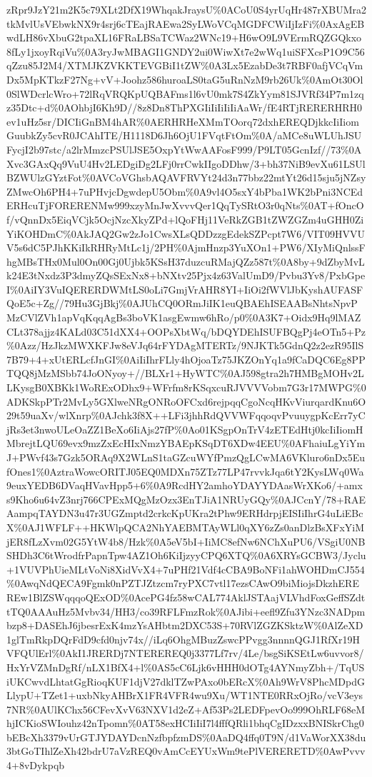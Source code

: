 \documentclass[]{article}
\begin{document}
zRpr9JzY21m2K5c79XLt2DfX19WhqakJraysU\%0ACoU0S4yrUqHr487rXBUMra2tkMvlUsVEbwkNX9r4srj6cTEajRAEwa2SyLWoVCqMGDFCWiIjIzFi\%0AxAgEBwdLH86vXbuG2tpaXL16FRaLBSaTCWaz2WNc19+H6wO9L9VErmRQZGQkxo8fLy1jxoyRqiVu\%0A3ryJwMBAGI1GNDY2ui0WiwXt7e2wWq1uiSFXcsP1O9C56qZzu85J2M4/XTMJKZVKKTEVGBiI1tZW\%0A3Lx5EzabDe3t7RBF0afjVCqVmDx5MpKTkzF27Ng+vV+Joohz586huroaLS0taG5uRnNzM9rb26Uk\%0AmOt30Ol0SlWDcrlcWro+72lRqVRQKpUQBAFms1l6vU0mk7S4ZkYym81SJVRf34P7m1zqz35Dtc+d\%0AOhbjI6Kh9D//8z8Dn8ThPXGIiIiIiIiIiAaWr/fE4RTjRERERHRH0ev1uHz5sr/DICIiGnBM4hAR\%0AERHRHeXMmTOorq72dxhEREQDjkkcIiIiomGuubkZy5cvR0JCAhITE/H1118D6Jh6OjU1FVqtFtOm\%0A/aMCe8uWLUhJSUFycjI2b97stc/a2lrMmzcPSUlJSE5OxpYtWwAAFosF999/P9LT05GcnIzf//73\%0AXvc3GAxQq9VuU4Hv2LEDgiDg2LFj0rrCwkIIgoDDhw/3+bh37NiB9evXu61LSUlBZWUlzGYztFot\%0AVCoVGhsbAQAVFRVYt24d3n77bbz22mtYt26d15sju5jNZsyZMwcOh6PH4+7uPHvjcDgwdepU5Obm\%0A9vl4O5sxY4bPba1WK2bPni3NCEdERHcuTjFORERENMw999xzyMnJwXvvvQer1QqTySRtO3r0qNts\%0AT+fOncOf/vQnnDx5EiqVCjk5OcjNzcXkyZPd+lQoFHj11VeRkZGB1tZWZGZm4uGHH0ZiYiKOHDmC\%0AkJAQ2Gw2zJo1CwsXLsQDDzzgEdekSZPcpt7W6/VIT09HVVUV5s6dC5PJhKKiIkRHRyMtLc1j/2PH\%0AjmHnzp3YuXOn1+PW6/XIyMiQnlssFhgMBsTHx0Mul0On00Gj0Ujbk5KSsH37duzcuRMajQZz587t\%0A8by+9dZbyMvLk24E3tNxdz3P3dmyZQsSExNx8+bNXtv25Pjx4z63ValUmD9/Pvbu3Yv8/PxbGpeI\%0AiIY3VuIQERERDWMtLS0oLi7GmjVrAHR8YI+IiOi2fWVlJbKyshAUFASFQoE5c+Zg//79Hu3GjBkj\%0AJUhCQ0ORmJiIK1euQBAEhISEAABsNhtsNpvPMzCVlZVh1apVqKqqAgBs3boVK1asgEwmw6hRo/p0\%0A3K7+Oidx9Hq9lMAZCLt378ajjz4KALd03C51dXX4+OOPsXbtWq/bDQYDEhISUFBQgPj4eOTn5+Pz\%0Azz/HzJkzMWXKFJw8eVJq64rFYDAgMTERTz/9NJKTk5GdnQ2z2ezR95IlS7B79+4+xUtERLcfJnGI\%0AiIiIhrFLly4hOjoaTz75JKZOnYq1a9fCaDQC6Eg8PPTQQ8jMzMSbb74JoONyoy+//BLXr1+HyWTC\%0AJ598gtra2h7HMBgMOHv2LLKysgB0XBKk1WoRExODhx9+WFrfm8rKSqxcuRJVVVVobm7G3r17MWPG\%0ADKSkpPTr2MvLy5GXlweNRgONRoOFCxd6rejpqqCgoNcqHKvViurqardKnu6O29t59uaXv/wlXnrp\%0AJchk3f8X++LFi3jhhRdQVVWFqqoqvPvuuygpKcErr7yCjRs3et3nwoULeOaZZ1BeXo6IiAjs27fP\%0Ao01KSgpOnTrV4zETEdHtj0kcIiIiomHMbrejtLQU69evx9mzZxEcHIxNmzYBAEpKSqDT6XDw4EEU\%0AFhaiuLgYiYmJ+PWvf43s7Gzk5ORAq9X2WLnS1taGZcuWYfPmzQgLCwMA6VKluro6nDx5EufOnes1\%0AztraWowcORITJ05EQ0MDXn75ZTz77LP47rvvkJqa6tY2KysLWq0Wa9euxYEDB6DVaqHVavHpp5+6\%0A9RcdHY2amhoYDAYYDAasWrXKo6/+amxs9Kho6u64vZ3nrj766CPExMQgMzOzx3EnTJiA1NRUyGQy\%0AJCcnY/78+RAEAampqTAYDN3u47r3UGZmptd2crkcKpUKra2tPhw9ERHdrpjEISIiIhrG4uLiEBcX\%0AJ1WFLF++HKWlpQCA2NhYAEBMTAyWLl0qXY6zZs0anDlzBsXFxYiMjER8fLzXvm02G5YtW4b8/Hzk\%0A5eV5bI+IiMC8efNw6NChXuPU6/VSgiU0NBSHDh3C6tWrodfrPapnTpw4AZ1Oh6KiIjzyyCPQ6XTQ\%0A6XRYsGCBW3/Jyclu+1VUVPhUieMLtVoNi8XidVvX4+7uPHf21Vdf4cCBA9BoNFi1ahWOHDmCJ554\%0AwqNdQECA9Fgmk0nPZTJZtzcm7ryPXC7vtl17ezsCAwO9biMiojsDkzhEREREw1BlZSWqqqoQExOD\%0AcePG4fz58wCAL774AklJSTAajVLVhdFoxGeffSZdttTQ0AAAuHz5Mvbv34/HH3/co39RFLFmzRok\%0AJibi+eefl9Zfu3YNzc3NADpmbzp8+DASEhJ6jbesrExK4mzYsAHbtm2DXC53S+70RVlZGZKSktzW\%0AlZeXD1glTmRkpDQrFdD9cfd0njv74x//iLq6OhgMBuzZswcPPvgg3nnnnQGJ1RfXr19HVFQUlErl\%0AkI1JRERDj7NTEREREQ0j3377Lf7rv/4Le/bsgSiKSEtLw6uvvor8/HxYrVZMnDgRf/nLX1BfX4+l\%0AS5cC6Ljk6vHHH0dOTg4AYNmyZbh+/TqUSiUKCwvdLhtatGgRioqKUF1djV27dklTZwPAxo0bERcX\%0Ah9WrV8PhcMDpdGLlypU+TZet1+uxbNkyAHBrX1FR4VFR4wu9Xu/WT1NTE0RRxOjRo/vcV3eys7NR\%0AUlKChx56CFevXvV63NXV1d2eZ+Af53Ps2LEDFpevOo999OhRLF68eMhjICKioSWIouhz42nTpomn\%0AT58exHCIiIiI7l4fffQRli1bhqCgIDzxxBNISkrChg0bEBcXh3379vUrGTJYDAYDcnNzfbpfzmDS\%0AaDQ4ffq0T9N/d1VaWorXX38du3btGoTIhlZeXh42bdrU7aVzREQ0vAmCcEYUxWm9tePlVERERETD\%0AwPvvv4+8vDykpqb
\end{document}
